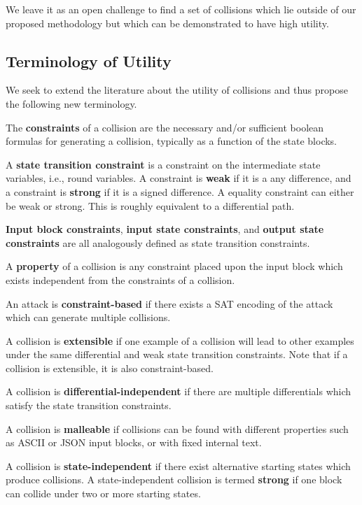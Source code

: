 \documentclass[letterpaper,twocolumn,10pt]{article}
\begin{document}
We leave it as an open challenge to find a set of collisions which lie outside
of our proposed methodology but which can be demonstrated to have high utility.

\subsection{Terminology of Utility}

We seek to extend the literature about the utility of collisions and thus
propose the following new terminology.

The \textbf{constraints} of a collision are the necessary and/or sufficient
boolean formulas for generating a collision, typically as a function of the
state blocks.

A \textbf{state transition constraint} is a constraint on the intermediate
state variables, i.e., round variables. A constraint is \textbf{weak} if
it is a any difference, and a constraint is \textbf{strong} if it is a
signed difference. A equality constraint can either be weak or strong. This
is roughly equivalent to a differential path.

\textbf{Input block constraints}, \textbf{input state constraints}, and
\textbf{output state constraints} are all analogously defined as state
transition constraints.

A \textbf{property} of a collision is any constraint placed upon the
input block which exists independent from the constraints of a collision.

An attack is \textbf{constraint-based} if there exists a SAT encoding of the
attack which can generate multiple collisions.

A collision is \textbf{extensible} if one example of a collision will lead to
other examples under the same differential and weak state transition constraints.
Note that if a collision is extensible, it is also constraint-based.

A collision is \textbf{differential-independent} if there are multiple
differentials which satisfy the state transition constraints.

A collision is \textbf{malleable} if collisions can be found with different
properties such as ASCII or JSON input blocks, or with fixed internal text.

A collision is \textbf{state-independent} if there exist alternative
starting states which produce collisions. A state-independent collision
is termed \textbf{strong} if one block can collide under two or more starting
states.
\end{document}
